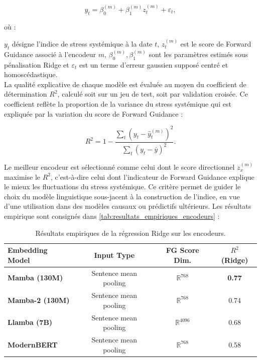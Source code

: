 \begin{equation}
y_t = \beta_0^{(m)} + \beta_1^{(m)} z_t^{(m)} + \varepsilon_t,
\end{equation}

où :

$y_t$ désigne l’indice de stress systémique à la date $t$, $z_t^{(m)}$ est le score de Forward Guidance associé à l’encodeur $m$, $\beta_0^{(m)}, \beta_1^{(m)}$ sont les paramètres estimés sous pénalisation Ridge et $\varepsilon_t$ est un terme d’erreur gaussien supposé centré et homoscédastique.\\

La qualité explicative de chaque modèle est évaluée au moyen du coefficient de détermination $R^2$, calculé soit sur un jeu de test, soit par validation croisée. Ce coefficient reflète la proportion de la variance du stress systémique qui est expliquée par la variation du score de Forward Guidance :

\begin{equation}
R^2 = 1 - \frac{\sum_{t} \left( y_t - \hat{y}_t^{(m)} \right)^2}{\sum_{t} \left( y_t - \bar{y} \right)^2}.
\end{equation}

Le meilleur encodeur est sélectionné comme celui dont le score directionnel $z_x^{(m)}$ maximise le $R^2$, c’est-à-dire celui dont l’indicateur de Forward Guidance explique le mieux les fluctuations du stress systémique. Ce critère permet de guider le choix du modèle linguistique sous-jacent à la construction de l’indice, en vue d’une utilisation dans des modèles causaux ou prédictifs ultérieurs. Les résultats empirique sont consignés dans \autoref{tab:resultats_empiriques_encodeurs} : 

\begin{table}[H]
    \centering
    \sffamily 
    \begin{tabular}{lccc}
     \toprule
     \textbf{Embedding Model} & \textbf{Input Type} & \textbf{FG Score Dim.} & \textbf{$R^2$ (Ridge)} \\
     \midrule
     \textbf{Mamba (130M)} & Sentence mean pooling & $\mathbb{R}^{768}$ & \textbf{0.77} \\
      \textbf{Mamba-2 (130M)} & Sentence mean pooling & $\mathbb{R}^{768}$   & 0.74 \\
     \textbf{Llamba (7B)} & Sentence mean pooling & $\mathbb{R}^{4096}$ & 0.68 \\
     \textbf{ModernBERT} & Sentence mean pooling & $\mathbb{R}^{768}$ & 0.58 \\
     \bottomrule
    \end{tabular}
    \caption{Résultats empiriques de la régression Ridge sur les encodeurs.}
    \label{tab:resultats_empiriques_encodeurs}
\end{table}

